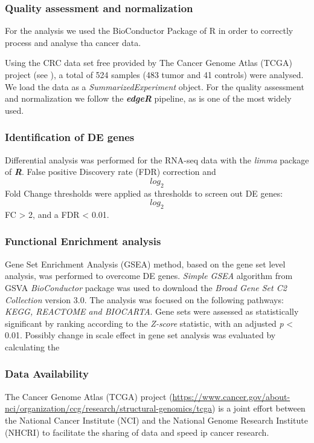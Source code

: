 \documentclass[9pt,twocolumn,twoside]{gsajnl}
\begin{document}
\subsubsection{Quality assessment and normalization}

For the analysis we used the BioConductor Package of R in order to correctly process and analyse tha cancer data. 

Using the CRC data set free provided by The Cancer Genome Atlas (TCGA) project (see ), a total of 524 samples (483 tumor and 41 controls) were analysed. We load the data as a \emph{SummarizedExperiment} object. For the quality assessment and normalization we follow the \textbf{\emph{edgeR}} pipeline, as is one of the most widely used.

\subsubsection{Identification of DE genes}

Differential analysis was performed for the RNA-seq data with the \emph{limma} package of \textbf{\emph{R}}. False positive Discovery rate (FDR) correction and \[log_2\]Fold Change thresholds were applied as thresholds to screen out DE genes: \[log_2\]FC > 2, and a FDR < 0.01.

\subsubsection{Functional Enrichment analysis}

Gene Set Enrichment Analysis (GSEA) method, based on the gene set level analysis, was performed to overcome DE genes. \textit{Simple GSEA} algorithm from GSVA \emph{BioConductor} package was used to download the \emph{Broad Gene Set C2 Collection} version 3.0. The analysis was focused on the following pathways: \textit{KEGG, REACTOME and BIOCARTA}. Gene sets were assessed as statistically significant by ranking according to the \textit{Z-score} statistic, with an adjusted \textit{p} < 0.01. Possibly change in scale effect in gene set analysis was evaluated by calculating the 


\subsubsection{Data Availability}
\label{sec:data:availability}

The Cancer Genome Atlas (TCGA) project (\url{https://www.cancer.gov/about-nci/organization/ccg/research/structural-genomics/tcga}) is a joint effort between the National Cancer Institute (NCI) and the National Genome Research Institute (NHCRI) to facilitate the sharing of data and speed ip cancer research. 
\end{document}
